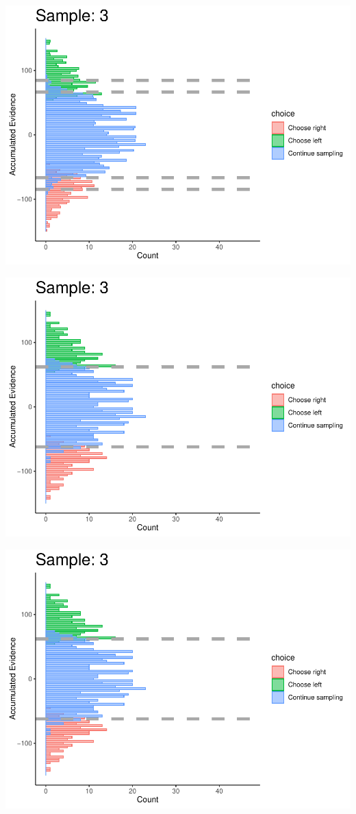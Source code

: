\documentclass[
]{book}
\begin{document}
\begin{center}\includegraphics[width=0.8\linewidth]{LateNightBayes_files/figure-latex/collapsing_check-20} \end{center}

\begin{center}\includegraphics[width=0.8\linewidth]{LateNightBayes_files/figure-latex/collapsing_check-21} \end{center}

\begin{center}\includegraphics[width=0.8\linewidth]{LateNightBayes_files/figure-latex/collapsing_check-22} \end{center}
\end{document}
